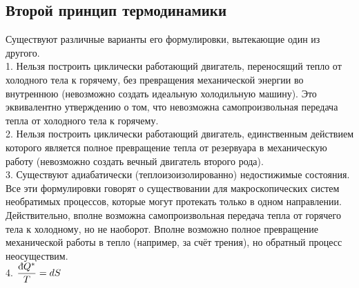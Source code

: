 \begin{multicols*}{2}
		\section{Второй принцип термодинамики}
		Существуют различные варианты его формулировки, вытекающие один из другого.\\
		1. Нельзя построить циклически работающий двигатель, переносящий тепло от холодного тела к горячему, без превращения механической энергии во внутреннюю (невозможно создать идеальную холодильную машину). Это эквивалентно утверждению о том, что невозможна самопроизвольная передача тепла от холодного тела к горячему.\\
		2. Нельзя построить циклически работающий двигатель, единственным действием которого является полное превращение тепла от резервуара в механическую работу (невозможно создать вечный двигатель второго рода).\\
		3. Существуют адиабатически (теплоизоизолированно) недостижимые состояния.\\
		Все эти формулировки говорят о существовании для макроскопических систем необратимых процессов, которые могут протекать только в одном направлении. Действительно, вполне возможна самопроизвольная передача тепла от горячего тела к холодному, но не наоборот. Вполне возможно полное превращение механической работы в тепло (например, за счёт трения), но обратный процесс неосуществим.\\
		4. $\dfrac{\mbox{\dj} Q^*}{T} = dS$\\


\end{multicols*}
